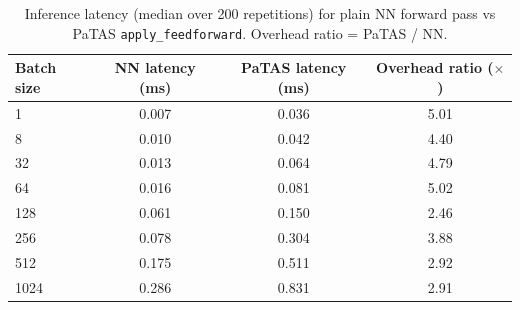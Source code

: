 \begin{table}[ht]
\centering
\caption{Inference latency (median over 200 repetitions) for plain NN forward pass vs PaTAS \texttt{apply\_feedforward}. Overhead ratio = PaTAS / NN.}
\label{tab:latency-inference}
\begin{tabular}{lccc}
\toprule
Batch size & NN latency (ms) & PaTAS latency (ms) & Overhead ratio ($\times$) \\
\midrule
1 & 0.007 & 0.036 & 5.01 \\
8 & 0.010 & 0.042 & 4.40 \\
32 & 0.013 & 0.064 & 4.79 \\
64 & 0.016 & 0.081 & 5.02 \\
128 & 0.061 & 0.150 & 2.46 \\
256 & 0.078 & 0.304 & 3.88 \\
512 & 0.175 & 0.511 & 2.92 \\
1024 & 0.286 & 0.831 & 2.91 \\
\bottomrule
\end{tabular}
\end{table}